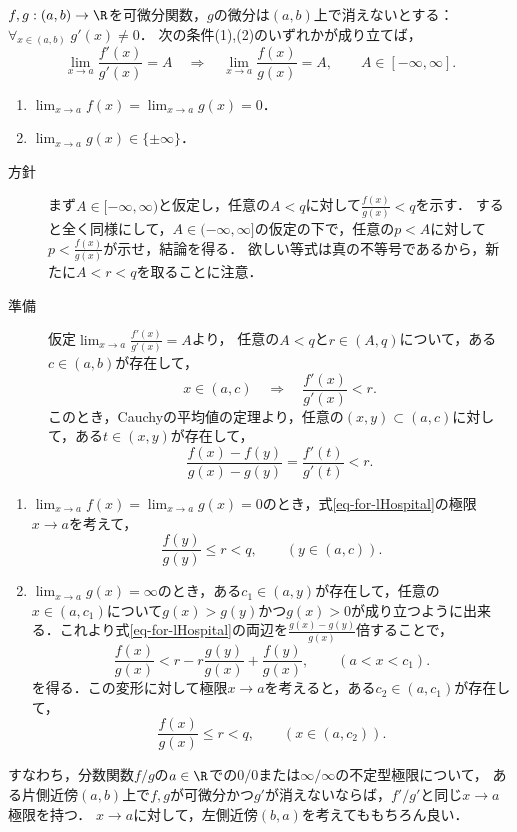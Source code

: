 \documentclass[uplatex, dvipdfmx]{jsreport}
\begin{document}
\begin{theorem}
    $f,g:(a,b)\to\R$を可微分関数，$g$の微分は$(a,b)$上で消えないとする：$\forall_{x\in(a,b)}\;g'(x)\ne0$．
    次の条件(1),(2)のいずれかが成り立てば，
    \[\lim_{x\to a}\frac{f'(x)}{g'(x)}=A\quad\Rightarrow\quad\lim_{x\to a}\frac{f(x)}{g(x)}=A,\qquad A\in[-\infty,\infty].\]
    \begin{enumerate}
        \item $\lim_{x\to a}f(x)=\lim_{x\to a}g(x)=0$．
        \item $\lim_{x\to a}g(x)\in\{\pm\infty\}$．
    \end{enumerate}
\end{theorem}
\begin{Proof}\mbox{}
    \begin{description}
        \item[方針] まず$A\in[-\infty,\infty)$と仮定し，任意の$A<q$に対して$\frac{f(x)}{g(x)}< q$を示す．
        すると全く同様にして，$A\in(-\infty,\infty]$の仮定の下で，任意の$p<A$に対して$p<\frac{f(x)}{g(x)}$が示せ，結論を得る．
        欲しい等式は真の不等号であるから，新たに$A<r<q$を取ることに注意．
        \item[準備]
        仮定$\lim_{x\to a}\frac{f'(x)}{g'(x)}=A$より，
        任意の$A<q$と$r\in(A,q)$について，ある$c\in(a,b)$が存在して，
        \[x\in(a,c)\quad\Rightarrow\quad\frac{f'(x)}{g'(x)}<r.\]
        このとき，Cauchyの平均値の定理より，任意の$(x,y)\subset(a,c)$に対して，ある$t\in(x,y)$が存在して，
        \begin{equation}\label{eq-for-lHospital}
            \frac{f(x)-f(y)}{g(x)-g(y)}=\frac{f'(t)}{g'(t)}<r.
        \end{equation}
    \end{description}
    \begin{enumerate}
        \item $\lim_{x\to a}f(x)=\lim_{x\to a}g(x)=0$のとき，式\ref{eq-for-lHospital}の極限$x\to a$を考えて，
        \[\frac{f(y)}{g(y)}\le r<q,\qquad(y\in(a,c)).\]
        \item $\lim_{x\to a}g(x)=\infty$のとき，ある$c_1\in(a,y)$が存在して，任意の$x\in(a,c_1)$について$g(x)>g(y)$かつ$g(x)>0$が成り立つように出来る．これより式\ref{eq-for-lHospital}の両辺を$\frac{g(x)-g(y)}{g(x)}$倍することで，
        \[\frac{f(x)}{g(x)}<r-r\frac{g(y)}{g(x)}+\frac{f(y)}{g(x)},\qquad(a<x<c_1).\]
        を得る．この変形に対して極限$x\to a$を考えると，ある$c_2\in(a,c_1)$が存在して，
        \[\frac{f(x)}{g(x)}\le r<q,\qquad(x\in(a,c_2)).\]
    \end{enumerate}
\end{Proof}
\begin{remarks}
    すなわち，分数関数$f/g$の$a\in\R$での$0/0$または$\infty/\infty$の不定型極限について，
    ある片側近傍$(a,b)$上で$f,g$が可微分かつ$g'$が消えないならば，$f'/g'$と同じ$x\to a$極限を持つ．
    $x\to a$に対して，左側近傍$(b,a)$を考えてももちろん良い．
\end{remarks}
\end{document}
